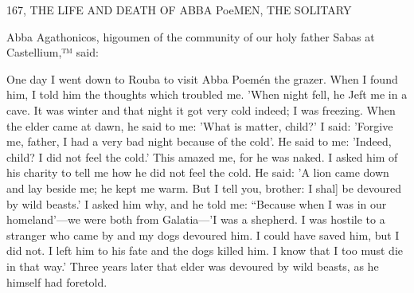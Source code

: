 167, THE LIFE AND DEATH OF ABBA
PoeMEN, THE SOLITARY

Abba Agathonicos, higoumen of the community of our holy father
Sabas at Castellium,™ said:

One day I went down to Rouba to visit Abba Poemén the grazer.
When I found him, I told him the thoughts which troubled me.
'When night fell, he Jeft me in a cave. It was winter and that night
it got very cold indeed; I was freezing. When the elder came at
dawn, he said to me: 'What is matter, child?' I said: 'Forgive me,
father, I had a very bad night because of the cold'. He said to me:
'Indeed, child? I did not feel the cold.' This amazed me, for he was
naked. I asked him of his charity to tell me how he did not feel the
cold. He said: 'A lion came down and lay beside me; he kept me
warm. But I tell you, brother: I shal] be devoured by wild beasts.'
I asked him why, and he told me: “Because when I was in our
homeland'—we were both from Galatia—'I was a shepherd. I was
hostile to a stranger who came by and my dogs devoured him. I
could have saved him, but I did not. I left him to his fate and the
dogs killed him. I know that I too must die in that way.' Three
years later that elder was devoured by wild beasts, as he himself had
foretold.

